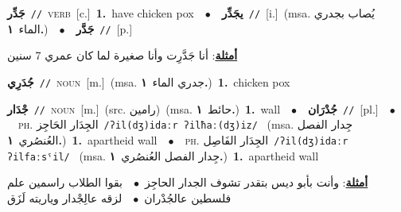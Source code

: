 \documentclass[10pt,a4paper,twoside]{article} %
\begin{document}
\begin{multicols}{2}
{{{{{{{{{{{{\setlength\topsep{0pt}\textbf{\foreignlanguage{arabic}{جَدِّر}}\ {\color{gray}\texttt{//}\color{black}}\ \textsc{verb}\ [c.]\ \textbf{1.}~have chicken pox\ \ $\bullet$\ \ \setlength\topsep{0pt}\textbf{\foreignlanguage{arabic}{يجَدِّر}}\ {\color{gray}\texttt{//}\color{black}}\ [i.]\ \color{gray}(msa. \foreignlanguage{arabic}{يُصاب بجدري الماء}~\foreignlanguage{arabic}{\textbf{١.}})\color{black}\ \ $\bullet$\ \ \setlength\topsep{0pt}\textbf{\foreignlanguage{arabic}{جَدَّر}}\ {\color{gray}\texttt{//}\color{black}}\ [p.]\  \begin{flushright}\color{gray}\foreignlanguage{arabic}{\textbf{\underline{\foreignlanguage{arabic}{أمثلة}}}: أنا جَدَّرِت وأنا صغيرة لما كان عمري 7 سنين}\end{flushright}\color{black}} \vspace{2mm}

{\setlength\topsep{0pt}\textbf{\foreignlanguage{arabic}{جُدَرِي}}\ {\color{gray}\texttt{//}\color{black}}\ \textsc{noun}\ [m.]\ \color{gray}(msa. \foreignlanguage{arabic}{جدري الماء}~\foreignlanguage{arabic}{\textbf{١.}})\color{black}\ \textbf{1.}~chicken pox\ 

{\setlength\topsep{0pt}\textbf{\foreignlanguage{arabic}{جْدَار}}\ {\color{gray}\texttt{//}\color{black}}\ \textsc{noun}\ [m.]\ (src. \color{gray}\foreignlanguage{arabic}{رامين}\color{black})\ \color{gray}(msa. \foreignlanguage{arabic}{حائط}~\foreignlanguage{arabic}{\textbf{١.}})\color{black}\ \textbf{1.}~wall\ \ $\bullet$\ \ \setlength\topsep{0pt}\textbf{\foreignlanguage{arabic}{جُدْرَان}}\ {\color{gray}\texttt{//}\color{black}}\ [pl.]\ \ $\bullet$\ \ \textsc{ph.} \color{gray} \foreignlanguage{arabic}{الجِدَار الحَاجِز}\color{black}\ {\color{gray}\texttt{/{\sffamily ʔil(dʒ)idaːr ʔilħaː(dʒ)iz}/}\color{black}}\ \color{gray} (msa. \foreignlanguage{arabic}{جِدار الفصل العُنصُري}~\foreignlanguage{arabic}{\textbf{١.}})\color{black}\ \textbf{1.}~apartheid wall\ \ $\bullet$\ \ \textsc{ph.} \color{gray} \foreignlanguage{arabic}{الجِدَار الفَاصِل}\color{black}\ {\color{gray}\texttt{/{\sffamily ʔil(dʒ)idaːr ʔilfaːsˤil}/}\color{black}}\ \color{gray} (msa. \foreignlanguage{arabic}{جِدار الفصل العُنصُري}~\foreignlanguage{arabic}{\textbf{١.}})\color{black}\ \textbf{1.}~apartheid wall\  \begin{flushright}\color{gray}\foreignlanguage{arabic}{\textbf{\underline{\foreignlanguage{arabic}{أمثلة}}}: وأنت بأبو ديس بتقدر تشوف الجدار الحاجِز\ $\bullet$\ \  بقوا الطلاب راسمين علم فلسطين عالجُدْران\ $\bullet$\ \  لزقه عالِجْدار وياريته لَزَق}\end{flushright}\color{black}} \vspace{2mm}

}}}}}}}}}}}}
\end{multicols}
\end{document}
